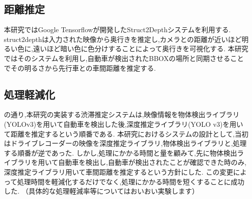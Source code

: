 \subsection{距離推定}
本研究ではGoogle Tensorflowが開発したStruct2Depthシステムを利用する.
struct2depthは入力された映像から奥行きを推定し,カメラとの距離が近いほど明るい色に,遠いほど暗い色に色分けすることによって奥行きを可視化する.
本研究ではそのシステムを利用し,自動車が検出されたBBOXの場所と同期させることでその明るさから先行車との車間距離を推定する.

\subsection{処理軽減化}
の通り,本研究の実装する渋滞推定システムは,映像情報を物体検出ライブラリ(YOLOv3)を用いて自動車を検出した後,深度推定ライブラリ(YOLO v3)を用いて距離を推定するという順番である.
本研究におけるシステムの設計として,当初はドライブレコーダーの映像を深度推定ライブラリ,物体検出ライブラリと,処理する順番が逆であった.
しかし,処理にかかる時間と量を顧みて,先に物体検出ライブラリを用いて自動車を検出し,自動車が検出されたことが確認できた時のみ,深度推定ライブラリ用いて車間距離を推定するという方針にした.
この変更によって処理時間を軽減化するだけでなく,処理にかかる時間を短くすることに成功した.
（具体的な処理軽減率等についてはおいおい実験します）

